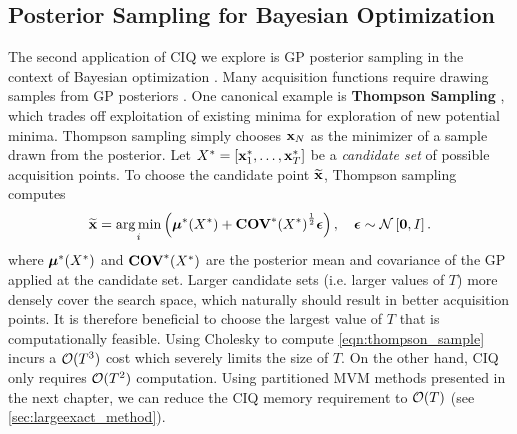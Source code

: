 \subsection{Posterior Sampling for Bayesian Optimization}
\label{sec:bayesopt_results}

The second application of CIQ we explore is GP posterior sampling in the context of Bayesian optimization \citep[e.g.][]{snoek2012practical}.
Many acquisition functions require drawing samples from GP posteriors \citep[e.g.][]{frazier2009knowledge,hernandez2014predictive,wang2017max}.
One canonical example is {\bf Thompson Sampling} \cite{thompson1933likelihood}, which trades off exploitation of existing minima for exploration of new potential minima.
Thompson sampling simply chooses $\mathbf{x}_N$ as the minimizer of a sample drawn from the posterior.
Let $X^* = [ \mathbf{x}^*_1, \ldots, \mathbf{x}^*_T ]$ be a \emph{candidate set} of possible acquisition points.
To choose the candidate point $\widetilde {\mathbf{x}}$, Thompson sampling computes
%
\begin{equation}
  \widetilde \bx = \argmin_{i} \left( \bmeantest(\bXtest) + {\Covtest(\bXtest)}^{\frac 1 2} \bepsilon \right),
  \quad
  \bepsilon \sim \normaldist{\bzero}{\bI}.
  \label{eqn:thompson_sample}
\end{equation}
%
where $\boldsymbol{\mu}^*(X^*)$ and $\textbf{COV}^*(X^*)$ are the posterior mean and covariance of the GP applied at the candidate set.
Larger candidate sets (i.e. larger values of $T$) more densely cover the search space, which naturally should result in better acquisition points.
It is therefore beneficial to choose the largest value of $T$ that is computationally feasible.
Using Cholesky to compute \cref{eqn:thompson_sample} incurs a $\bigo{T^3}$ cost which severely limits the size of $T$.
On the other hand, CIQ only requires $\bigo{T^2}$ computation.
Using partitioned MVM methods presented in the next chapter, we can reduce the CIQ memory requirement to $\bigo{T}$ (see \cref{sec:largeexact_method}).

